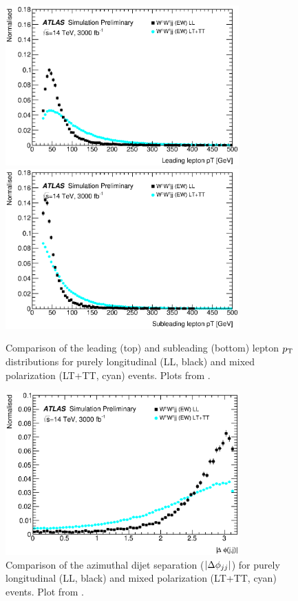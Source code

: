 \begin{figure}[htp]
  \centering
  \includegraphics[width=0.8\textwidth]{figs/ssww_upgrade/polarization/lepton0_pt_pass9}\\
  \includegraphics[width=0.8\textwidth]{figs/ssww_upgrade/polarization/lepton1_pt_pass9}
  \caption{Comparison of the leading (top) and subleading (bottom) lepton $p_{\mathrm{T}}$ distributions for purely longitudinal (LL, black) and mixed polarization (LT+TT, cyan) \ssww events.  Plots from \cite{2018.ssww-upgrade-support}.}
  \label{fig:polarization_leppt}
\end{figure}

\begin{figure}[htp]
  \centering
  \includegraphics[width=0.8\textwidth]{figs/ssww_upgrade/polarization/dijet_absdphijj_pass9}
  \caption{Comparison of the azimuthal dijet separation ($|\Delta\phi_{jj}|$) for purely longitudinal (LL, black) and mixed polarization (LT+TT, cyan) \ssww events.  Plot from \cite{2018.ssww-upgrade-support}.}
  \label{fig:polarization_dphijj}
\end{figure}
